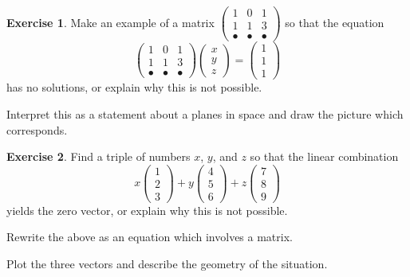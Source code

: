 \documentclass[11pt]{amsart}
\theoremstyle{definition}
\newtheorem{exercise}{Exercise}
\begin{document}
\vspace{1cm}

\begin{exercise}
Make an example of a matrix $\left( \begin{smallmatrix} 1 & 0 & 1\\ 1 & 1 & 3 \\ \bullet & \bullet & \bullet \end{smallmatrix}\right)$ so that the equation
\[
\begin{pmatrix} 1 & 0 & 1\\ 1 & 1 & 3 \\ \bullet & \bullet & \bullet \end{pmatrix}\begin{pmatrix} x \\ y \\ z \end{pmatrix} = \begin{pmatrix} 1 \\ 1 \\ 1 \end{pmatrix}
\]
has no solutions, or explain why this is not possible.

Interpret this as a statement about a planes in space and draw the picture which corresponds.

\end{exercise}

\vspace{1cm}

\begin{exercise}
Find a triple of numbers $x$, $y$, and $z$ so that the linear combination
\[
x \begin{pmatrix} 1 \\ 2 \\ 3 \end{pmatrix} + y \begin{pmatrix} 4 \\ 5\\ 6 \end{pmatrix} + z \begin{pmatrix} 7 \\ 8 \\ 9 \end{pmatrix}
\]
yields the zero vector, or explain why this is not possible.

Rewrite the above as an equation which involves a matrix.

Plot the three vectors and describe the geometry of the situation.

\end{exercise}
\end{document}
